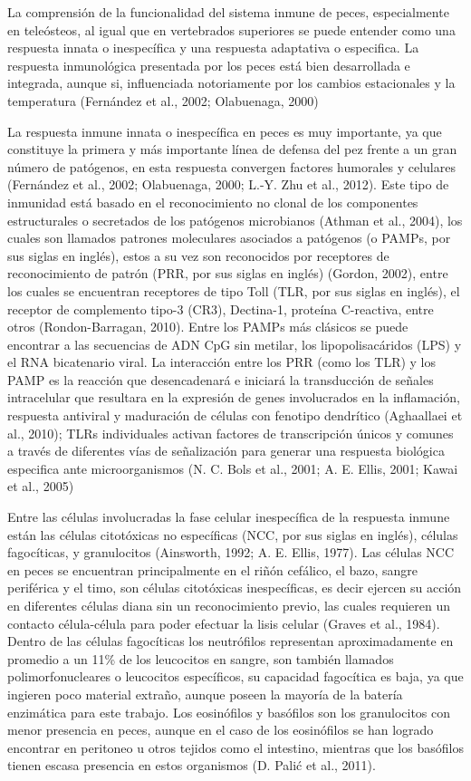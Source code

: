 \documentclass[12pt,a4paper,oneside]{scrbook}
\begin{document}
La comprensión de la funcionalidad del sistema inmune de peces,
especialmente en teleósteos, al igual que en vertebrados superiores se
puede entender como una respuesta innata o inespecífica y una respuesta
adaptativa o especifica. La respuesta inmunológica presentada por los
peces está bien desarrollada e integrada, aunque si, influenciada
notoriamente por los cambios estacionales y la temperatura (Fernández et
al., 2002; Olabuenaga, 2000)

La respuesta inmune innata o inespecífica en peces es muy importante, ya
que constituye la primera y más importante línea de defensa del pez
frente a un gran número de patógenos, en esta respuesta convergen
factores humorales y celulares (Fernández et al., 2002; Olabuenaga,
2000; L.-Y. Zhu et al., 2012). Este tipo de inmunidad está basado en el
reconocimiento no clonal de los componentes estructurales o secretados
de los patógenos microbianos (Athman et al., 2004)⁠, los cuales son
llamados patrones moleculares asociados a patógenos (o PAMPs, por sus
siglas en inglés), estos a su vez son reconocidos por receptores de
reconocimiento de patrón (PRR, por sus siglas en inglés) (Gordon, 2002),
entre los cuales se encuentran receptores de tipo Toll (TLR, por sus
siglas en inglés), el receptor de complemento tipo-3 (CR3), Dectina-1,
proteína C-reactiva, entre otros (Rondon-Barragan, 2010). Entre los
PAMPs más clásicos se puede encontrar a las secuencias de ADN CpG sin
metilar, los lipopolisacáridos (LPS) y el RNA bicatenario viral. La
interacción entre los PRR (como los TLR) y los PAMP es la reacción que
desencadenará e iniciará la transducción de señales intracelular que
resultara en la expresión de genes involucrados en la inflamación,
respuesta antiviral y maduración de células con fenotipo dendrítico
(Aghaallaei et al., 2010)⁠; TLRs individuales activan factores de
transcripción únicos y comunes a través de diferentes vías de
señalización para generar una respuesta biológica especifica ante
microorganismos (N. C. Bols et al., 2001; A. E. Ellis, 2001; Kawai et
al., 2005)

Entre las células involucradas la fase celular inespecífica de la
respuesta inmune están las células citotóxicas no específicas (NCC, por
sus siglas en inglés), células fagocíticas, y granulocitos (Ainsworth,
1992; A. E. Ellis, 1977). Las células NCC en peces se encuentran
principalmente en el riñón cefálico, el bazo, sangre periférica y el
timo, son células citotóxicas inespecíficas, es decir ejercen su acción
en diferentes células diana sin un reconocimiento previo, las cuales
requieren un contacto célula-célula para poder efectuar la lisis celular
(Graves et al., 1984). Dentro de las células fagocíticas los neutrófilos
representan aproximadamente en promedio a un 11\% de los leucocitos en
sangre, son también llamados polimorfonucleares o leucocitos
específicos, su capacidad fagocítica es baja, ya que ingieren poco
material extraño, aunque poseen la mayoría de la batería enzimática para
este trabajo. Los eosinófilos y basófilos son los granulocitos con menor
presencia en peces, aunque en el caso de los eosinófilos se han logrado
encontrar en peritoneo u otros tejidos como el intestino, mientras que
los basófilos tienen escasa presencia en estos organismos (D. Palić et
al., 2011).
\end{document}
